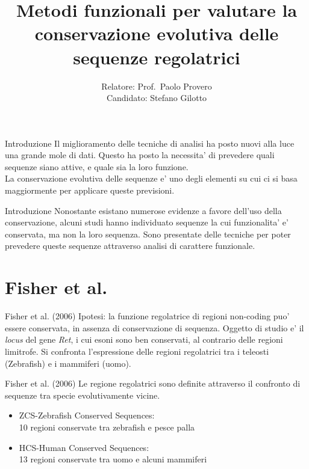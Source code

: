 \documentclass{beamer}
\title{Metodi funzionali per valutare la conservazione evolutiva delle sequenze regolatrici}
\date{}
\author{Relatore: Prof.\ Paolo Provero\\Candidato: Stefano Gilotto}
\institute{Universita' degli studi di Torino\\Dipartimento di Biotecnologie Molecolari e Scinze per la Salute}
\begin{document}
    \maketitle

    \begin{frame}[plain]{Introduzione}
        Il miglioramento delle tecniche di analisi ha posto nuovi alla luce una grande mole di dati.
        Questo ha posto la necessita' di prevedere quali sequenze siano attive, e quale sia la loro
        funzione.\\
        La conservazione evolutiva delle sequenze e' uno degli elementi su cui ci si basa maggiormente
        per applicare queste previsioni.
    \end{frame}


    \begin{frame}[plain]{Introduzione}
        Nonostante esistano numerose evidenze a favore dell'uso della conservazione,
        alcuni studi hanno individuato sequenze la cui funzionalita' e' conservata,
        ma non la loro sequenza.
        Sono presentate delle tecniche per poter prevedere queste sequenze attraverso
        analisi di carattere funzionale.
    \end{frame}

    \section{Fisher et al.}

    \begin{frame}[plain]{Fisher et al. (2006)}
        Ipotesi: la funzione regolatrice di regioni non-coding puo' essere conservata,
        in assenza di conservazione di sequenza.
        Oggetto di studio e' il \emph{locus} del gene \emph{Ret}, i cui esoni sono ben conservati,
        al contrario delle regioni limitrofe. Si confronta l'espressione delle regioni regolatrici
        tra i teleosti (Zebrafish) e i mammiferi (uomo).\\
    \end{frame}


    \begin{frame}[plain]{Fisher et al. (2006)}
        Le regione regolatrici sono definite attraverso il confronto di sequenze
        tra specie evolutivamente vicine.
        \begin{itemize}
            \item ZCS-Zebrafish Conserved Sequences:\\
            10 regioni conservate tra zebrafish e pesce palla
            \item HCS-Human Conserved Sequences:\\
            13 regioni conservate tra uomo e alcuni mammiferi
        \end{itemize}
    \end{frame}
\end{document}
